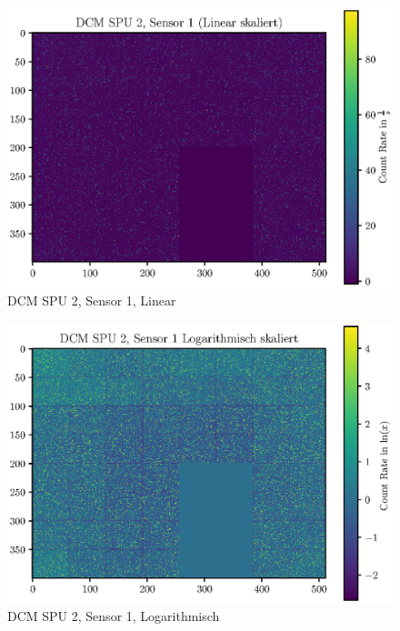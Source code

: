 \documentclass[12pt,twoside,a4paper]{scrartcl}
\begin{document}
			\begin{figure}[H]
				\includegraphics[width = \textwidth]{Plots/DCM/DCM_SPU2_Sensor1_lin.eps}
				\caption{DCM SPU 2, Sensor 1, Linear}
			\end{figure}

			\begin{figure}[H]
				\includegraphics[width = \textwidth]{Plots/DCM/DCM_SPU2_Sensor1_log.eps}
				\caption{DCM SPU 2, Sensor 1, Logarithmisch}
			\end{figure}
\end{document}
